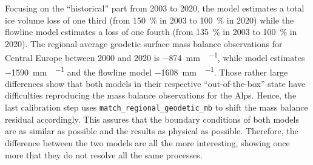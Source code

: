       Focusing on the ``historical'' part from 2003 to 2020, the \vas{} model estimates a total ice volume loss of one third (from \SI{150}{\percent} in 2003 to \SI{100}{\percent} in 2020) while the flowline model estimates a loss of one fourth (from \SI{135}{\percent} in 2003 to \SI{100}{\percent} in 2020).
      The regional average geodetic surface mass balance observations for Central Europe between 2000 and 2020 is \SI{-874}{\milli\metre\waterequivalent\per\year}, while \vas{} model estimates \SI{-1590}{\milli\metre\waterequivalent\per\year} and the flowline model \SI{-1608}{\milli\metre\waterequivalent\per\year}. Those rather large differences show that both models in their respective ``out-of-the-box'' state have difficulties reproducing the mass balance observations for the Alps. Hence, the last calibration step uses \lstinline`match_regional_geodetic_mb` to shift the mass balance residual \bias{} accordingly. This assures that the boundary conditions of both models are as similar as possible and the results as physical as possible. Therefore, the difference between the two models are all the more interesting, showing once more that they do not resolve all the same processes.

